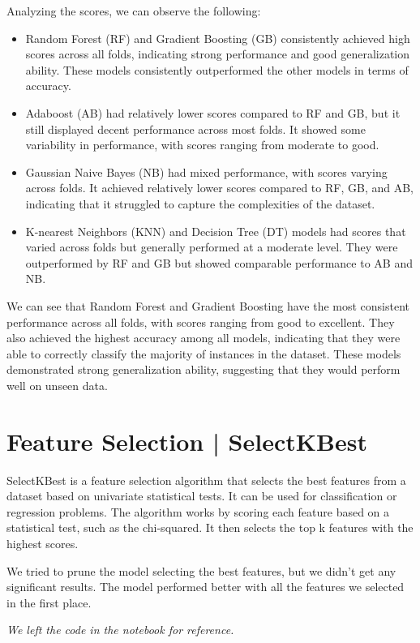 Analyzing the scores, we can observe the following:
\begin{itemize}
    \item  Random Forest (RF) and Gradient Boosting (GB) consistently achieved high scores across all folds, indicating strong performance and good generalization ability. These models consistently outperformed the other models in terms of accuracy.
    \item Adaboost (AB) had relatively lower scores compared to RF and GB, but it still displayed decent performance across most folds. It showed some variability in performance, with scores ranging from moderate to good.
    \item Gaussian Naive Bayes (NB) had mixed performance, with scores varying across folds. It achieved relatively lower scores compared to RF, GB, and AB, indicating that it struggled to capture the complexities of the dataset.
    \item K-nearest Neighbors (KNN) and Decision Tree (DT) models had scores that varied across folds but generally performed at a moderate level. They were outperformed by RF and GB but showed comparable performance to AB and NB.
\end{itemize}

We can see that Random Forest and Gradient Boosting have the most consistent performance across all folds, with scores ranging from good to excellent. They also achieved the highest accuracy among all models, indicating that they were able to correctly classify the majority of instances in the dataset. These models demonstrated strong generalization ability, suggesting that they would perform well on unseen data.

\section{Feature Selection | SelectKBest}
SelectKBest is a feature selection algorithm that selects the best features from a dataset based on univariate statistical tests. It can be used for classification or regression problems. The algorithm works by scoring each feature based on a statistical test, such as the chi-squared. It then selects the top k features with the highest scores.

We tried to prune the model selecting the best features, but we didn't get any significant results. The model performed better with all the features we selected in the first place.

\textit{We left the code in the notebook for reference.}

